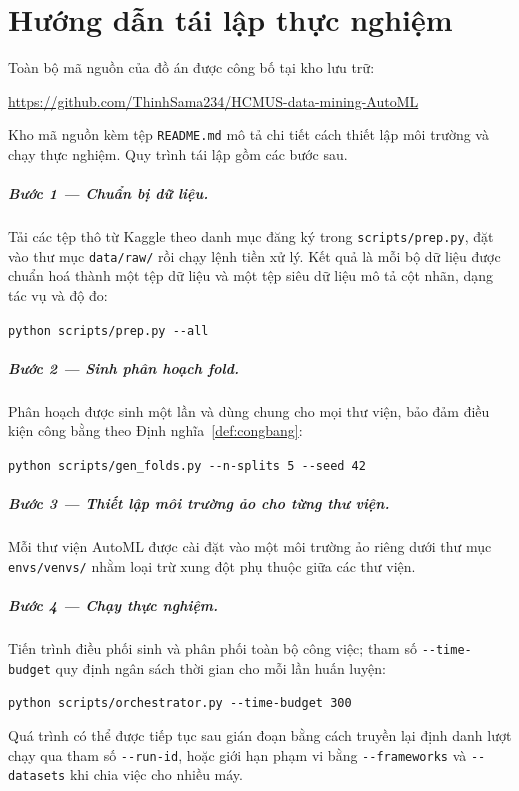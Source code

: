 \chapter{Hướng dẫn tái lập thực nghiệm}
\label{ch:phuluc-repo}

Toàn bộ mã nguồn của đồ án được công bố tại kho lưu trữ:
\begin{center}
\url{https://github.com/ThinhSama234/HCMUS-data-mining-AutoML}
\end{center}

Kho mã nguồn kèm tệp \texttt{README.md} mô tả chi tiết cách thiết lập môi trường
và chạy thực nghiệm. Quy trình tái lập gồm các bước sau.

\paragraph{Bước 1 --- Chuẩn bị dữ liệu.} Tải các tệp thô từ Kaggle theo danh mục
đăng ký trong \texttt{scripts/prep.py}, đặt vào thư mục \texttt{data/raw/} rồi
chạy lệnh tiền xử lý. Kết quả là mỗi bộ dữ liệu được chuẩn hoá thành một tệp dữ
liệu và một tệp siêu dữ liệu mô tả cột nhãn, dạng tác vụ và độ đo:
\begin{center}
\texttt{python scripts/prep.py -{}-all}
\end{center}

\paragraph{Bước 2 --- Sinh phân hoạch fold.} Phân hoạch được sinh một lần và dùng
chung cho mọi thư viện, bảo đảm điều kiện công bằng theo
Định nghĩa~\ref{def:congbang}:
\begin{center}
\texttt{python scripts/gen\_folds.py -{}-n-splits 5 -{}-seed 42}
\end{center}

\paragraph{Bước 3 --- Thiết lập môi trường ảo cho từng thư viện.} Mỗi thư viện
AutoML được cài đặt vào một môi trường ảo riêng dưới thư mục \texttt{envs/venvs/}
nhằm loại trừ xung đột phụ thuộc giữa các thư viện.

\paragraph{Bước 4 --- Chạy thực nghiệm.} Tiến trình điều phối sinh và phân phối
toàn bộ công việc; tham số \texttt{-{}-time-budget} quy định ngân sách thời gian
cho mỗi lần huấn luyện:
\begin{center}
\texttt{python scripts/orchestrator.py -{}-time-budget 300}
\end{center}
Quá trình có thể được tiếp tục sau gián đoạn bằng cách truyền lại định danh lượt
chạy qua tham số \texttt{-{}-run-id}, hoặc giới hạn phạm vi bằng
\texttt{-{}-frameworks} và \texttt{-{}-datasets} khi chia việc cho nhiều máy.

